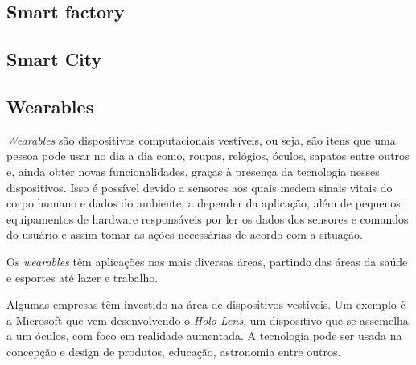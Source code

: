 \subsection{Smart factory}





\subsection{Smart City}

\subsection{Wearables}

\textit{Wearables} são dispositivos computacionais vestíveis, ou seja, são itens que uma pessoa pode usar no dia a dia como, roupas, relógios, óculos, sapatos entre outros e, ainda obter novas funcionalidades, graças à presença da tecnologia nesses dispositivos. Isso é possível devido a sensores aos quais medem sinais vitais do corpo humano e dados do ambiente, a depender da aplicação, além de pequenos equipamentos de hardware responsáveis por ler os dados dos sensores e comandos do usuário e assim tomar as ações necessárias de acordo com a situação.

Os \textit{wearables} têm aplicações nas mais diversas áreas, partindo das áreas da saúde e esportes até lazer e trabalho. 

Algumas empresas têm investido na área de dispositivos vestíveis. Um exemplo é a Microsoft que vem desenvolvendo o \textit{Holo Lens}, um dispositivo que se assemelha a um óculos, com foco em realidade aumentada. A tecnologia pode ser usada na concepção e design de produtos, educação, astronomia entre outros.

